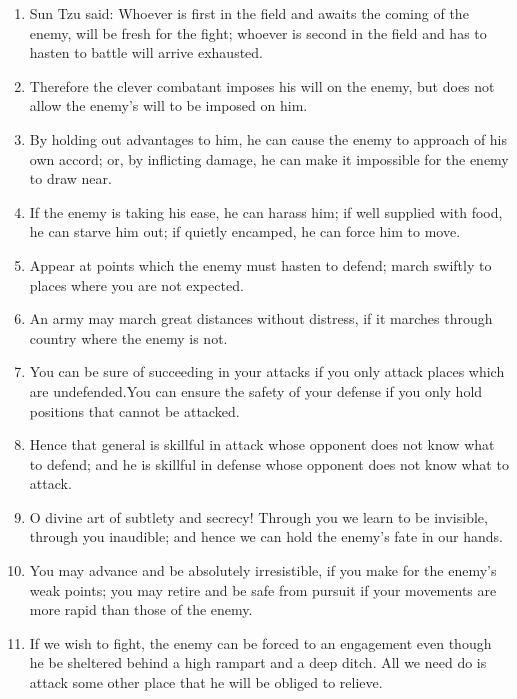 \begin{enumerate}
  
\item Sun Tzu said:  Whoever is first in the field and
    awaits the coming of the enemy, will be fresh for the fight;
    whoever is second in the field and has to hasten to battle
    will arrive exhausted.

  \item Therefore the clever combatant imposes his will on the enemy,
    but does not allow the enemy's will to be imposed on him.

  \item By holding out advantages to him, he can cause the enemy to
    approach of his own accord; or, by inflicting damage, he can make
    it impossible for the enemy to draw near.

  \item If the enemy is taking his ease, he can harass him; if well
    supplied with food, he can starve him out; if quietly encamped, he
    can force him to move.

  \item Appear at points which the enemy must hasten to defend; march
    swiftly to places where you are not expected.

  \item An army may march great distances without distress, if it
    marches through country where the enemy is not.

  \item You can be sure of succeeding in your attacks if you only
    attack places which are undefended.You can ensure the safety of
    your defense if you only hold positions that cannot be attacked.

  \item Hence that general is skillful in attack whose opponent does
    not know what to defend; and he is skillful in defense whose
    opponent does not know what to attack.

  \item O divine art of subtlety and secrecy! Through you we learn to
    be invisible, through you inaudible; and hence we can hold the
    enemy's fate in our hands.

  \item You may advance and be absolutely irresistible, if you make
    for the enemy's weak points; you may retire and be safe from
    pursuit if your movements are more rapid than those of the enemy.

  \item If we wish to fight, the enemy can be forced to an engagement
    even though he be sheltered behind a high rampart and a deep
    ditch. All we need do is attack some other place that he will be
    obliged to relieve.


\end{enumerate}
